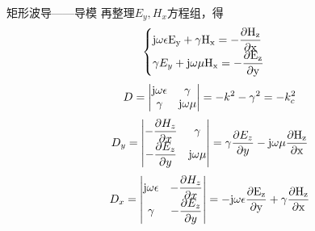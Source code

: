 \begin{frame}{矩形波导——导模}
    再整理$E_y,H_x$方程组，得
    \begin{align*}
        \begin{cases}
            \rm{j}\omega\epsilon E_y+\gamma H_x=-\dfrac{\partial H_z}{\partial x} \\
            \gamma E_y+\rm{j}\omega\mu H_x=-\dfrac{\partial E_z}{\partial y}
        \end{cases}
    \end{align*}
    \begin{align*}
        D=
        \begin{vmatrix}
            \rm{j}\omega\epsilon & \gamma          \\
            \gamma               & \rm{j}\omega\mu \\
        \end{vmatrix}
        =-k^2-\gamma^2=-k_c^2
    \end{align*}
    \begin{align*}
        D_y=
        \begin{vmatrix}
            -\dfrac{\partial H_z}{\partial x} & \gamma          \\
            -\dfrac{\partial E_z}{\partial y} & \rm{j}\omega\mu \\
        \end{vmatrix}
        =\gamma\frac{\partial E_z}{\partial y}-\rm{j}\omega\mu\frac{\partial H_z}{\partial x}
    \end{align*}
    \begin{align*}
        D_x=
        \begin{vmatrix}
            \rm{j}\omega\epsilon & -\dfrac{\partial H_z}{\partial x} \\
            \gamma               & -\dfrac{\partial E_z}{\partial y} \\
        \end{vmatrix}
        =-\rm{j}\omega\epsilon\frac{\partial E_z}{\partial y}+\gamma \frac{\partial H_z}{\partial x}
    \end{align*}
\end{frame}

